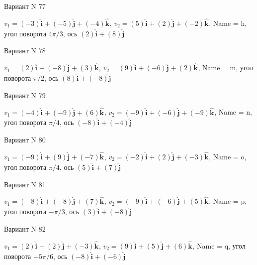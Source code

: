 \documentclass[11pt]{report}
\begin{document}
Вариант N 77

$v_1 = \left(-3\right)\mathbf{\hat{i}_{}} + \left(-5\right)\mathbf{\hat{j}_{}} + \left(-4\right)\mathbf{\hat{k}_{}}$, $v_2 = \left(5\right)\mathbf{\hat{i}_{}} + \left(2\right)\mathbf{\hat{j}_{}} + \left(-2\right)\mathbf{\hat{k}_{}}$, Name = h, угол поворота $4 \pi / 3$, ось $\left(2\right)\mathbf{\hat{i}_{}} + \left(8\right)\mathbf{\hat{j}_{}}$

Вариант N 78

$v_1 = \left(2\right)\mathbf{\hat{i}_{}} + \left(-8\right)\mathbf{\hat{j}_{}} + \left(3\right)\mathbf{\hat{k}_{}}$, $v_2 = \left(9\right)\mathbf{\hat{i}_{}} + \left(-6\right)\mathbf{\hat{j}_{}} + \left(2\right)\mathbf{\hat{k}_{}}$, Name = m, угол поворота $\pi / 2$, ось $\left(8\right)\mathbf{\hat{i}_{}} + \left(-8\right)\mathbf{\hat{j}_{}}$

Вариант N 79

$v_1 = \left(-4\right)\mathbf{\hat{i}_{}} + \left(-9\right)\mathbf{\hat{j}_{}} + \left(6\right)\mathbf{\hat{k}_{}}$, $v_2 = \left(-9\right)\mathbf{\hat{i}_{}} + \left(-6\right)\mathbf{\hat{j}_{}} + \left(-9\right)\mathbf{\hat{k}_{}}$, Name = n, угол поворота $\pi / 4$, ось $\left(-8\right)\mathbf{\hat{i}_{}} + \left(-4\right)\mathbf{\hat{j}_{}}$

Вариант N 80

$v_1 = \left(-9\right)\mathbf{\hat{i}_{}} + \left(9\right)\mathbf{\hat{j}_{}} + \left(-7\right)\mathbf{\hat{k}_{}}$, $v_2 = \left(-2\right)\mathbf{\hat{i}_{}} + \left(2\right)\mathbf{\hat{j}_{}} + \left(-3\right)\mathbf{\hat{k}_{}}$, Name = o, угол поворота $\pi / 4$, ось $\left(5\right)\mathbf{\hat{i}_{}} + \left(7\right)\mathbf{\hat{j}_{}}$

Вариант N 81

$v_1 = \left(-8\right)\mathbf{\hat{i}_{}} + \left(-8\right)\mathbf{\hat{j}_{}} + \left(7\right)\mathbf{\hat{k}_{}}$, $v_2 = \left(-9\right)\mathbf{\hat{i}_{}} + \left(-6\right)\mathbf{\hat{j}_{}} + \left(5\right)\mathbf{\hat{k}_{}}$, Name = p, угол поворота $- \pi / 3$, ось $\left(3\right)\mathbf{\hat{i}_{}} + \left(-8\right)\mathbf{\hat{j}_{}}$

Вариант N 82

$v_1 = \left(2\right)\mathbf{\hat{i}_{}} + \left(2\right)\mathbf{\hat{j}_{}} + \left(-3\right)\mathbf{\hat{k}_{}}$, $v_2 = \left(9\right)\mathbf{\hat{i}_{}} + \left(5\right)\mathbf{\hat{j}_{}} + \left(6\right)\mathbf{\hat{k}_{}}$, Name = q, угол поворота $- 5 \pi / 6$, ось $\left(-8\right)\mathbf{\hat{i}_{}} + \left(-6\right)\mathbf{\hat{j}_{}}$
\end{document}
